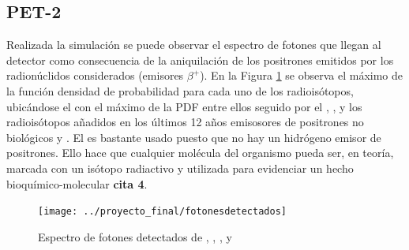 \documentclass[12pt,a4paper,onecolumn]{article}
\begin{document}
\subsection*{PET-2} 
Realizada la simulación se puede observar el espectro de fotones que llegan al detector como consecuencia de la aniquilación de los positrones emitidos por los radionúclidos considerados (emisores $\beta^+$). En la Figura \ref{fig:fotonesdetectados} se observa el máximo de la función densidad de probabilidad para cada uno de los radioisótopos, ubicándose el  con el máximo de la PDF entre ellos seguido por el , ,  y los radioisótopos añadidos en los últimos 12 años emisosores de positrones no biológicos  y . El  es bastante usado puesto que no hay un hidrógeno emisor de positrones. Ello hace que cualquier molécula del organismo pueda ser, en teoría, marcada con un isótopo radiactivo y utilizada para evidenciar un hecho bioquímico-molecular \textbf{cita 4}. 

\begin{figure}[H]
	\centering
	\texttt{[image: ../proyecto\_final/fotonesdetectados]}
	\caption{Espectro de fotones detectados de , , ,  y }
	\label{fig:fotonesdetectados}
\end{figure}
\end{document}

